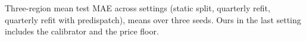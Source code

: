\providecommand{\materialsdir}{.}
\begin{table}[t]
  \centering
  \caption{Three-region mean test MAE across settings (static split, quarterly
    refit, quarterly refit with predispatch), means over three seeds. Ours in
    the last setting includes the calibrator and the price floor.}
  \label{tab:settings}
  \small
  
\end{table}
